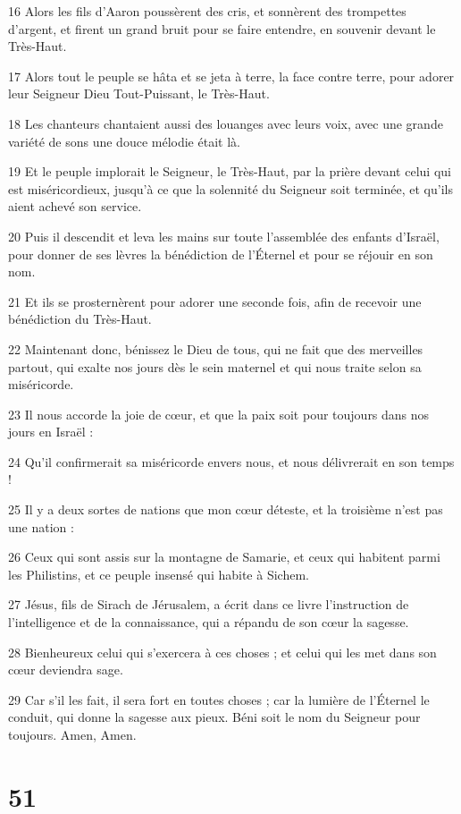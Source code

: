 \par 16 Alors les fils d'Aaron poussèrent des cris, et sonnèrent des trompettes d'argent, et firent un grand bruit pour se faire entendre, en souvenir devant le Très-Haut.
\par 17 Alors tout le peuple se hâta et se jeta à terre, la face contre terre, pour adorer leur Seigneur Dieu Tout-Puissant, le Très-Haut.
\par 18 Les chanteurs chantaient aussi des louanges avec leurs voix, avec une grande variété de sons une douce mélodie était là.
\par 19 Et le peuple implorait le Seigneur, le Très-Haut, par la prière devant celui qui est miséricordieux, jusqu'à ce que la solennité du Seigneur soit terminée, et qu'ils aient achevé son service.
\par 20 Puis il descendit et leva les mains sur toute l'assemblée des enfants d'Israël, pour donner de ses lèvres la bénédiction de l'Éternel et pour se réjouir en son nom.
\par 21 Et ils se prosternèrent pour adorer une seconde fois, afin de recevoir une bénédiction du Très-Haut.
\par 22 Maintenant donc, bénissez le Dieu de tous, qui ne fait que des merveilles partout, qui exalte nos jours dès le sein maternel et qui nous traite selon sa miséricorde.
\par 23 Il nous accorde la joie de cœur, et que la paix soit pour toujours dans nos jours en Israël :
\par 24 Qu'il confirmerait sa miséricorde envers nous, et nous délivrerait en son temps !
\par 25 Il y a deux sortes de nations que mon cœur déteste, et la troisième n'est pas une nation :
\par 26 Ceux qui sont assis sur la montagne de Samarie, et ceux qui habitent parmi les Philistins, et ce peuple insensé qui habite à Sichem.
\par 27 Jésus, fils de Sirach de Jérusalem, a écrit dans ce livre l'instruction de l'intelligence et de la connaissance, qui a répandu de son cœur la sagesse.
\par 28 Bienheureux celui qui s'exercera à ces choses ; et celui qui les met dans son cœur deviendra sage.
\par 29 Car s'il les fait, il sera fort en toutes choses ; car la lumière de l'Éternel le conduit, qui donne la sagesse aux pieux. Béni soit le nom du Seigneur pour toujours. Amen, Amen.

\chapter{51}

